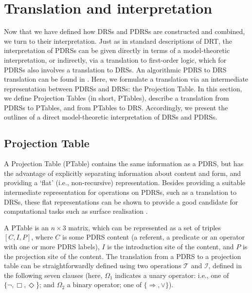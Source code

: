 \section{Translation and interpretation}\label{sec:translating}

Now that we have defined how DRSs and PDRSs are constructed and combined, we
turn to their interpretation. Just as in standard descriptions of DRT, the
interpretation of PDRSs can be given directly in terms of a model-theoretic
interpretation, or indirectly, via a translation to first-order logic, which
for PDRSs also involves a translation to DRSs. An algorithmic PDRS to DRS
translation can be found in \cite{venhuizen2013iwcs}. Here, we formulate
a translation via an intermediate representation between PDRSs and DRSs: the
Projection Table. In this section, we define Projection Tables (in short,
PTables), describe a translation from PDRSs to PTables, and from PTables to
DRS. Accordingly, we present the outlines of a direct model-theoretic
interpretation of DRSs and PDRSs. 

\subsection{Projection Table}

A Projection Table (PTable) contains the same information as a PDRS, but has the
advantage of explicitly separating information about content and form, and
providing a `flat' (i.e., non-recursive) representation. 
Besides providing
a suitable intermediate representation for operations on PDRSs, such as
a translation to DRSs, these flat representations can be shown to provide
a good candidate for computational tasks such as surface realisation
.

A PTable is an $n\times3$ matrix, which can be represented as a set of
triples $[C,I,P]$, where $C$ is some PDRS content (a referent, a predicate
or an operator with one or more PDRS labels), $I$ is the introduction site
of the content, and  $P$ is the projection site of the content. The
translation from a PDRS to a projection table can be straightforwardly
defined using two operations $\mathcal{T}$ and $\mathcal{I}$, defined in the
following seven clauses (here, $\Omega_1$ indicates a unary operator: i.e.,
one of $\{\neg, \Box, \Diamond$\}; and $\Omega_2$ a binary operator; one of
$\{\Rightarrow, \vee\}$).

